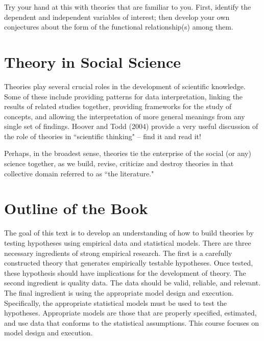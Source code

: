 \documentclass[11pt,openany]{book}\usepackage[]{graphicx}\usepackage[]{color}
\begin{document}
Try your hand at this with theories that are familiar to you. First, identify the dependent and independent variables of interest; then develop your own conjectures about the form of the functional relationship(s) among them.

\section{Theory in Social Science}

Theories play several crucial roles in the development of scientific knowledge. Some of these include providing patterns for data interpretation, linking the results of related studies together, providing frameworks for the study of concepts, and allowing the interpretation of more general meanings from any single set of findings. Hoover and Todd (2004) provide a very useful discussion of the role of theories in ``scientific thinking" -- find it and read it!
\begin{grbox}
\end{grbox}
Perhaps, in the broadest sense, theories tie the enterprise of the social (or any) science together, as we build, revise, criticize and destroy theories in that collective domain referred to as ``the literature."

\section{Outline of the Book}

The goal of this text is to develop an understanding of how to build theories by testing hypotheses using empirical data and statistical models. There are three necessary ingredients of strong empirical research. The first is a carefully constructed theory that generates empirically testable hypotheses. Once tested, these hypothesis should have implications for the development of theory. The second ingredient is quality data. The data should be valid, reliable, and relevant. The final ingredient is using the appropriate model design and execution. Specifically, the appropriate statistical models must be used  to test the hypotheses. Appropriate models are those that are properly specified, estimated, and use data that conforms to the statistical assumptions. This course focuses on model design and execution.
\end{document}
